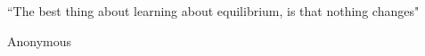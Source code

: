 



\begin{frame}
\vspace{3cm}
	\begin{minipage}[b]{.9\linewidth}
	\epigraph{``The best thing about learning about equilibrium, is that nothing changes" }{Anonymous}
		
	\end{minipage}
\end{frame}
